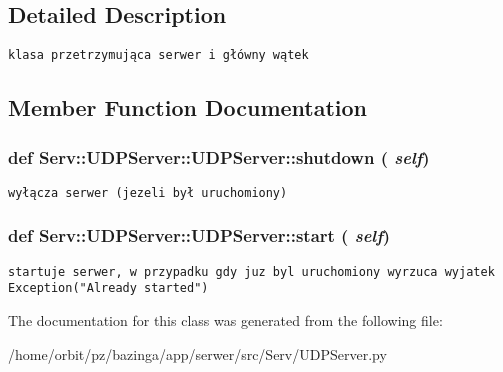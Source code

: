 \subsection{Detailed Description}


\footnotesize\begin{verbatim}klasa przetrzymująca serwer i główny wątek

\end{verbatim}
\normalsize
 

\subsection{Member Function Documentation}
\hypertarget{class_serv_1_1_u_d_p_server_1_1_u_d_p_server_43b3b2016322a79953939e56653d226d}{
\subsubsection[{shutdown}]{\setlength{\rightskip}{0pt plus 5cm}def Serv::UDPServer::UDPServer::shutdown ( {\em self})}}
\label{class_serv_1_1_u_d_p_server_1_1_u_d_p_server_43b3b2016322a79953939e56653d226d}




\footnotesize\begin{verbatim}wyłącza serwer (jezeli był uruchomiony)

\end{verbatim}
\normalsize
 \hypertarget{class_serv_1_1_u_d_p_server_1_1_u_d_p_server_9feda8e8dfee13803aa3fd07ddd003a1}{
\subsubsection[{start}]{\setlength{\rightskip}{0pt plus 5cm}def Serv::UDPServer::UDPServer::start ( {\em self})}}
\label{class_serv_1_1_u_d_p_server_1_1_u_d_p_server_9feda8e8dfee13803aa3fd07ddd003a1}




\footnotesize\begin{verbatim}startuje serwer, w przypadku gdy juz byl uruchomiony wyrzuca wyjatek Exception("Already started")

\end{verbatim}
\normalsize
 

The documentation for this class was generated from the following file:\begin{CompactItemize}
\item 
/home/orbit/pz/bazinga/app/serwer/src/Serv/UDPServer.py\end{CompactItemize}
